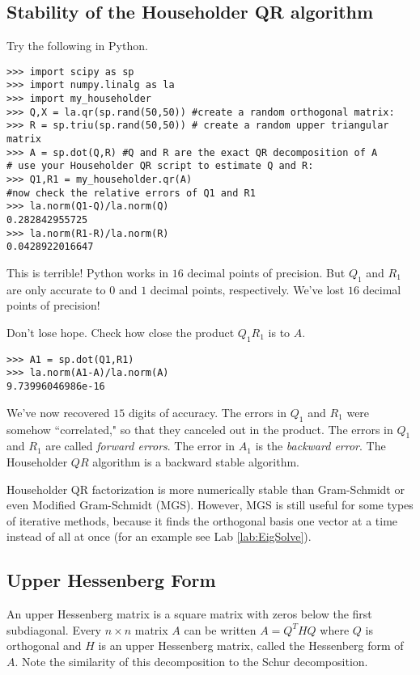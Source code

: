 \subsection*{Stability of the Householder QR algorithm}

Try the following in Python.

\begin{lstlisting}
>>> import scipy as sp
>>> import numpy.linalg as la
>>> import my_householder
>>> Q,X = la.qr(sp.rand(50,50)) #create a random orthogonal matrix:
>>> R = sp.triu(sp.rand(50,50)) # create a random upper triangular matrix
>>> A = sp.dot(Q,R) #Q and R are the exact QR decomposition of A
# use your Householder QR script to estimate Q and R:
>>> Q1,R1 = my_householder.qr(A)
#now check the relative errors of Q1 and R1
>>> la.norm(Q1-Q)/la.norm(Q)
0.282842955725
>>> la.norm(R1-R)/la.norm(R)
0.0428922016647
\end{lstlisting}
This is terrible! 
Python works in $16$ decimal points of precision.
But $Q_1$ and $R_1$ are only accurate to $0$ and $1$ decimal points, respectively.
We've lost $16$ decimal points of precision!

Don't lose hope. Check how close the product $Q_1 R_1$ is to $A$.
\begin{lstlisting}
>>> A1 = sp.dot(Q1,R1)
>>> la.norm(A1-A)/la.norm(A)
9.73996046986e-16
\end{lstlisting}
We've now recovered $15$ digits of accuracy.
The errors in $Q_1$ and $R_1$ were somehow ``correlated," so that they canceled out in the product.
The errors in $Q_1$ and $R_1$ are called \emph{forward errors}.
The error in $A_1$ is the \emph{backward error}.
The Householder $QR$ algorithm is a backward stable algorithm.

Householder QR factorization is more numerically stable than Gram-Schmidt or even Modified Gram-Schmidt (MGS).
However, MGS is still useful for some types of iterative methods, because it finds the orthogonal basis one vector at a time instead of all at once (for an example see Lab \ref{lab:EigSolve}).

\subsection*{Upper Hessenberg Form}
An upper Hessenberg matrix is a square matrix with zeros below the first subdiagonal.
Every  $n \times n$ matrix $A$ can be written $A = Q^THQ$ where $Q$ is orthogonal and $H$ is an upper Hessenberg matrix, called the Hessenberg form of $A$.
Note the similarity of this decomposition to the Schur decomposition.


